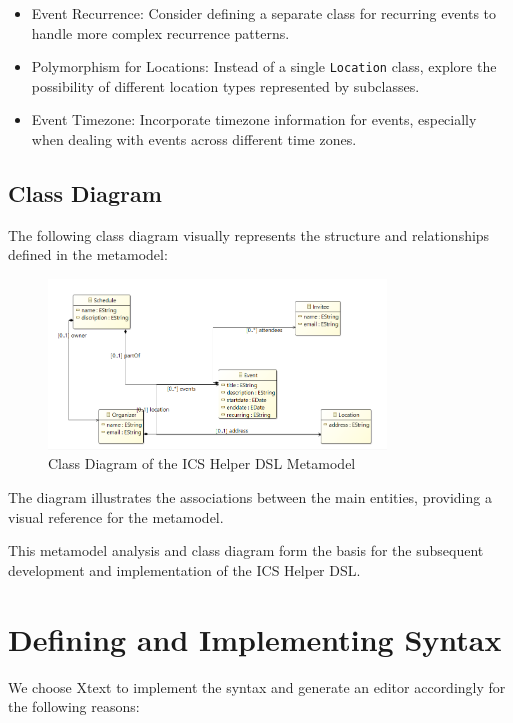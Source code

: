 \documentclass[12pt, letterpaper, twoside]{article}
\begin{document}
\begin{itemize}
    \item Event Recurrence: Consider defining a separate class for recurring events to handle more complex recurrence patterns.
    \item Polymorphism for Locations: Instead of a single \texttt{Location} class, explore the possibility of different location types represented by subclasses.
    \item Event Timezone: Incorporate timezone information for events, especially when dealing with events across different time zones.
\end{itemize}

\subsection{Class Diagram}

The following class diagram visually represents the structure and relationships defined in the metamodel:

\begin{figure}[H]
    \centering
    \includegraphics[width=0.8\textwidth]{class.png}
    \caption{Class Diagram of the ICS Helper DSL Metamodel}
    \label{fig:class-diagram}
\end{figure}

The diagram illustrates the associations between the main entities, providing a visual reference for the metamodel.

This metamodel analysis and class diagram form the basis for the subsequent development and implementation of the ICS Helper DSL.


\newpage
\section{Defining and Implementing Syntax}
We choose Xtext to implement the syntax and generate an editor accordingly for the following reasons:
\end{document}
